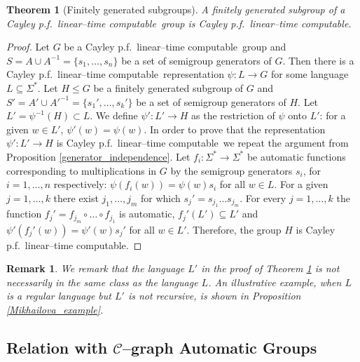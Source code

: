 \documentclass[article,12pt]{elsarticle}
\newtheorem{theorem}{Theorem}
\newtheorem{remark}{Remark}
\newcommand\linearC{Cayley p.f.~linear--time computable}
\begin{document}
\begin{theorem}[Finitely generated subgroups]
	\label{subgroupsofquasiCayleyarequasiCayley}   
	A finitely generated subgroup of a 
	\linearC\ group is \linearC. 
\end{theorem}

\begin{proof} 
	Let $G$ be a \linearC\ group 
	and $S=A \cup A^{-1} = \{s_1,\dots,s_n\}$ be a set of semigroup 
	generators of $G$.   
	Then there is a \linearC\ representation  
	$\psi : L \rightarrow G$ for some language 
	$L \subseteq \Sigma^*$.  
	Let $H \leqslant G$ be a finitely generated subgroup 
	of $G$ and $S' = A' \cup A'^{-1}= 
	\{s_1', \dots, s_k '\}$ be a 
	set of semigroup generators of $H$. Let 
	$L' = \psi^{-1}(H) \subset L$.  
	We define $\psi': L' \rightarrow H$ as the 
	restriction of $\psi$ onto $L'$: 
	for a given $w \in L'$, $\psi'(w) = \psi(w)$. 
	In order to prove that the representation 
	$\psi': L' \rightarrow H$ is \linearC\ we repeat the argument from  
	Proposition \ref{generator_independence}.  
	Let $f_i : \Sigma^* \rightarrow \Sigma^*$  
	be automatic functions corresponding 
	to multiplications in $G$ by the semigroup 
	generators $s_i$, for $i =1, \dots, n$  respectively: 
	$\psi (f_i (w)) = \psi (w) s_i$ for all $w \in L$.  
	For a given $j =1, \dots , k$ there exist 
	$j_1, \dots, j_m$ for which 
	$s_j ' = s_{j_1} \dots s_{j_m}$. 
	For every $j=1,\dots,k$ the function 
	$f_j' = f_{j_m} \circ \dots \circ f_{j_1}$ is automatic, 
	$f_j ' (L') \subseteq L'$ and 
	$\psi' (f_j '(w)) = \psi ' (w) s_j '$ for all $w \in L'$. 
	Therefore, the group $H$ is \linearC. 
\end{proof}
\begin{remark}	 
	We remark that the language $L'$ in the proof of 
	Theorem \ref{subgroupsofquasiCayleyarequasiCayley} 
	is not necessarily in the same class as the language 
	$L$. An illustrative example, when 
	$L$ is a regular language but 
	$L'$ is not recursive, is 
	shown in Proposition \ref{Mikhailova_example}.     
\end{remark}
\subsection{Relation with $\mathcal{C}$--graph Automatic Groups}\label{subsec:CGA}
\end{document}
